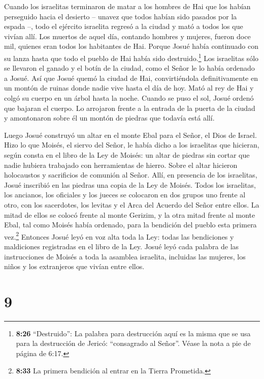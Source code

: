  Cuando los israelitas terminaron de matar a los hombres de
Hai que los habían perseguido hacia el desierto -- unavez que todos
habían sido pasados por la espada --, todo el ejército israelita regresó
a la ciudad y mató a todos los que vivían allí.  Los
muertos de aquel día, contando hombres y mujeres, fueron doce mil,
quienes eran todos los habitantes de Hai.  Porque Josué
había continuado con su lanza hasta que todo el pueblo de Hai había sido
destruido.\footnote{\textbf{8:26} ``Destruido'': La palabra para
  destrucción aquí es la misma que se usa para la destrucción de Jericó:
  ``consagrado al Señor''. Véase la nota a pie de página de 6:17.}
 Los israelitas sólo se llevaron el ganado y el botín de la
ciudad, como el Señor le lo había ordenado a Josué.  Así
que Josué quemó la ciudad de Hai, convirtiéndola definitivamente en un
montón de ruinas donde nadie vive hasta el día de hoy. 
Mató al rey de Hai y colgó su cuerpo en un árbol hasta la noche. Cuando
se puso el sol, Josué ordenó que bajaran el cuerpo. Lo arrojaron frente
a la entrada de la puerta de la ciudad y amontonaron sobre él un montón
de piedras que todavía está allí.

 Luego Josué construyó un altar en el monte Ebal para el
Señor, el Dios de Israel.  Hizo lo que Moisés, el siervo
del Señor, le había dicho a los israelitas que hicieran, según consta en
el libro de la Ley de Moisés: un altar de piedras sin cortar que nadie
hubiera trabajado con herramientas de hierro. Sobre el altar hicieron
holocaustos y sacrificios de comunión al Señor.  Allí, en
presencia de los israelitas, Josué inscribió en las piedras una copia de
la Ley de Moisés.  Todos los israelitas, los ancianos, los
oficiales y los jueces se colocaron en dos grupos uno frente al otro,
con los sacerdotes, los levitas y el Arca del Acuerdo del Señor entre
ellos. La mitad de ellos se colocó frente al monte Gerizim, y la otra
mitad frente al monte Ebal, tal como Moisés había ordenado, para la
bendición del pueblo esta primera vez.\footnote{\textbf{8:33} La primera
  bendición al entrar en la Tierra Prometida.}  Entonces
Josué leyó en voz alta toda la Ley: todas las bendiciones y maldiciones
registradas en el libro de la Ley.  Josué leyó cada palabra
de las instrucciones de Moisés a toda la asamblea israelita, incluidas
las mujeres, los niños y los extranjeros que vivían entre ellos.

\hypertarget{section-8}{%
\section{9}\label{section-8}}

